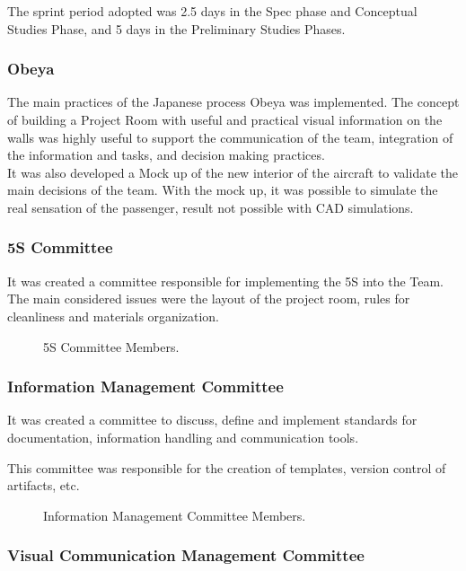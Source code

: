 The sprint period adopted was 2.5 days in the Spec phase and Conceptual Studies Phase, and 5 days in the Preliminary Studies Phases.
\subsubsection{Obeya}

The main practices of the Japanese process Obeya was implemented. The
concept of building a Project Room with useful and practical visual information on the
walls was highly useful to support the communication of the team, integration of the
information and tasks, and decision making practices.
\\It was also developed a Mock up of the new interior of the aircraft to validate the main decisions of the team. With the mock up, it was possible to simulate the real sensation of the passenger, result not possible with CAD simulations.

\subsubsection{5S Committee}
It was created a committee responsible for implementing the 5S into the Team. The
main considered issues were the layout of the project room, rules for cleanliness and
materials organization.

\begin{figure}[H] %
\caption{5S Committee Members.}
\label{fig:5SCommitteeMembers}
\end{figure}

\subsubsection{Information Management Committee}

It was created a committee to discuss, define and implement standards for
documentation, information handling and communication tools.

This committee was responsible for the creation of templates, version control of
artifacts, etc.

\begin{figure}[H] %
\caption{Information Management Committee Members.}
\label{fig:InformationManagementCommitteMembers}
\end{figure}

\subsubsection{Visual Communication Management Committee}


